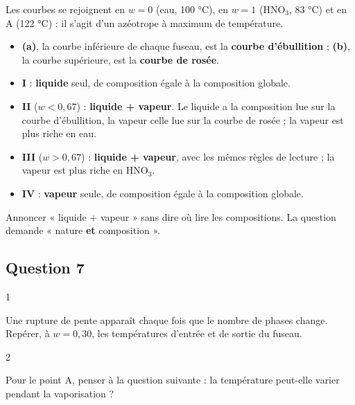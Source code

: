 \documentclass[11pt,a4paper]{article}
\providecommand{\tightlist}{\setlength{\itemsep}{0pt}\setlength{\parskip}{0pt}}
\begin{document}
Les courbes se rejoignent en \(w=0\) (eau, 100 °C), en \(w=1\) (HNO\(_3\), 83 °C) et en A (122 °C) : il s'agit d'un azéotrope à maximum de température.

\begin{itemize}
\tightlist
\item
  \textbf{(a)}, la courbe inférieure de chaque fuseau, est la \textbf{courbe d'ébullition} ; \textbf{(b)}, la courbe supérieure, est la \textbf{courbe de rosée}.
\item
  \textbf{I} : \textbf{liquide} seul, de composition égale à la composition globale.
\item
  \textbf{II} (\(w<0{,}67\)) : \textbf{liquide + vapeur}. Le liquide a la composition lue sur la courbe d'ébullition, la vapeur celle lue sur la courbe de rosée ; la vapeur est plus riche en eau.
\item
  \textbf{III} (\(w>0{,}67\)) : \textbf{liquide + vapeur}, avec les mêmes règles de lecture ; la vapeur est plus riche en HNO\(_3\).
\item
  \textbf{IV} : \textbf{vapeur} seule, de composition égale à la composition globale.
\end{itemize}

\begin{piege}

Annoncer « liquide + vapeur » sans dire où lire les compositions. La question demande « nature \textbf{et} composition ».

\end{piege}

\hypertarget{question-7}{%
\subsection{Question 7}\label{question-7}}

\begin{indication}{1}

Une rupture de pente apparaît chaque fois que le nombre de phases change. Repérer, à \(w=0{,}30\), les températures d'entrée et de sortie du fuseau.

\end{indication}

\begin{indication}{2}

Pour le point A, penser à la question suivante : la température peut-elle varier pendant la vaporisation ?

\end{indication}
\end{document}
